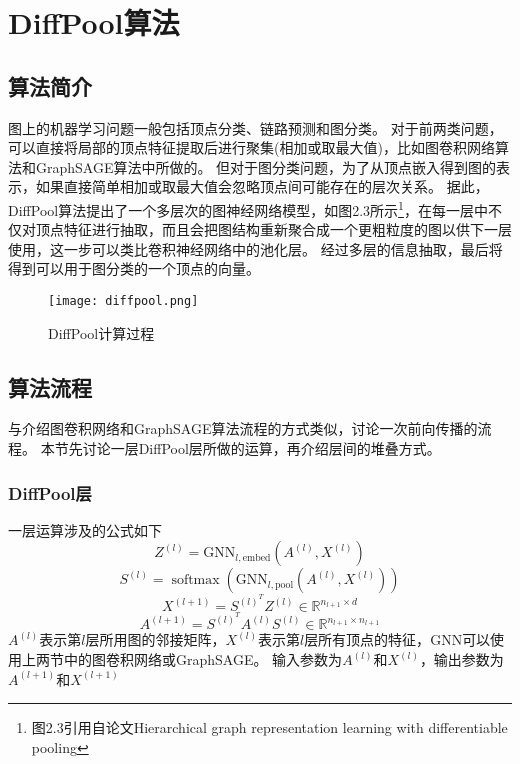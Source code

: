 \section{DiffPool算法}

\subsection{算法简介}
图上的机器学习问题一般包括顶点分类、链路预测和图分类。
对于前两类问题，可以直接将局部的顶点特征提取后进行聚集(相加或取最大值)，比如图卷积网络算法和GraphSAGE算法中所做的。
但对于图分类问题，为了从顶点嵌入得到图的表示，如果直接简单相加或取最大值会忽略顶点间可能存在的层次关系。
据此，DiffPool算法\cite{diffpool}提出了一个多层次的图神经网络模型，如图2.3所示\footnote{图2.3引用自论文Hierarchical graph representation learning with
differentiable pooling}，在每一层中不仅对顶点特征进行抽取，而且会把图结构重新聚合成一个更粗粒度的图以供下一层使用，这一步可以类比卷积神经网络中的池化层。
经过多层的信息抽取，最后将得到可以用于图分类的一个顶点的向量。

\begin{figure}[htb]
    \centering
    \texttt{[image: diffpool.png]}
    \caption{DiffPool计算过程}
\end{figure}

\subsection{算法流程}
与介绍图卷积网络和GraphSAGE算法流程的方式类似，讨论一次前向传播的流程。
本节先讨论一层DiffPool层所做的运算，再介绍层间的堆叠方式。

\subsubsection{DiffPool层}
\begin{definition}
    一层运算涉及的公式如下
    \begin{equation}
        Z^{(l)}=\mathrm{GNN}_{l, \mathrm{embed}}\left(A^{(l)}, X^{(l)}\right) 
    \end{equation}
    \begin{equation}
        S^{(l)}=\operatorname{softmax}\left(\mathrm{GNN}_{l, \mathrm{pool}}\left(A^{(l)}, X^{(l)}\right)\right)
    \end{equation}
    \begin{equation}
        X^{(l+1)} =S^{(l)^{T}} Z^{(l)} \in \mathbb{R}^{n_{l+1} \times d}
    \end{equation}
    \begin{equation}
        A^{(l+1)} =S^{(l)^{T}} A^{(l)} S^{(l)} \in \mathbb{R}^{n_{l+1} \times n_{l+1}}
    \end{equation}
    $A^{(l)}$表示第$l$层所用图的邻接矩阵，$X^{(l)}$表示第$l$层所有顶点的特征，$\mathrm{GNN}$可以使用上两节中的图卷积网络或GraphSAGE。
    输入参数为$A^{(l)}$和$X^{(l)}$，输出参数为$A^{(l+1)}$和$X^{(l+1)}$
\end{definition}

